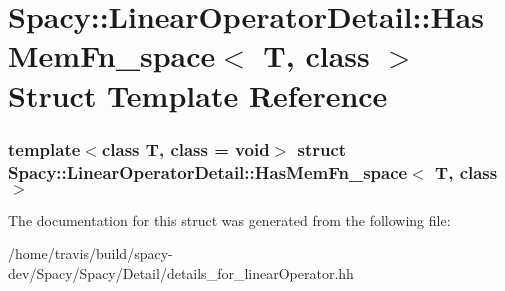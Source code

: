 \hypertarget{structSpacy_1_1LinearOperatorDetail_1_1HasMemFn__space}{\section{\-Spacy\-:\-:\-Linear\-Operator\-Detail\-:\-:\-Has\-Mem\-Fn\-\_\-space$<$ \-T, class $>$ \-Struct \-Template \-Reference}
\label{structSpacy_1_1LinearOperatorDetail_1_1HasMemFn__space}
}
\subsubsection*{template$<$class T, class = void$>$ struct Spacy\-::\-Linear\-Operator\-Detail\-::\-Has\-Mem\-Fn\-\_\-space$<$ T, class $>$}



\-The documentation for this struct was generated from the following file\-:\begin{DoxyCompactItemize}
\item 
/home/travis/build/spacy-\/dev/\-Spacy/\-Spacy/\-Detail/details\-\_\-for\-\_\-linear\-Operator.\-hh\end{DoxyCompactItemize}
